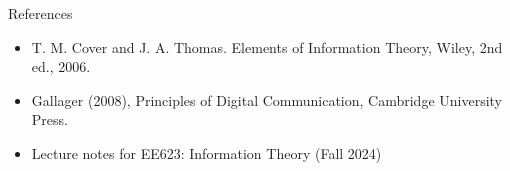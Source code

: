 \documentclass[9pt]{beamer}
\begin{document}
    \begin{frame}{References}
        \begin{itemize}
            \item T. M. Cover and J. A. Thomas. Elements of Information Theory, Wiley, 2nd ed., 2006.
            \item Gallager (2008), Principles of Digital Communication, Cambridge University Press.
            \item Lecture notes for EE623: Information Theory (Fall 2024)
        \end{itemize}
        \vspace{6cm}
    \end{frame}
\end{document}

